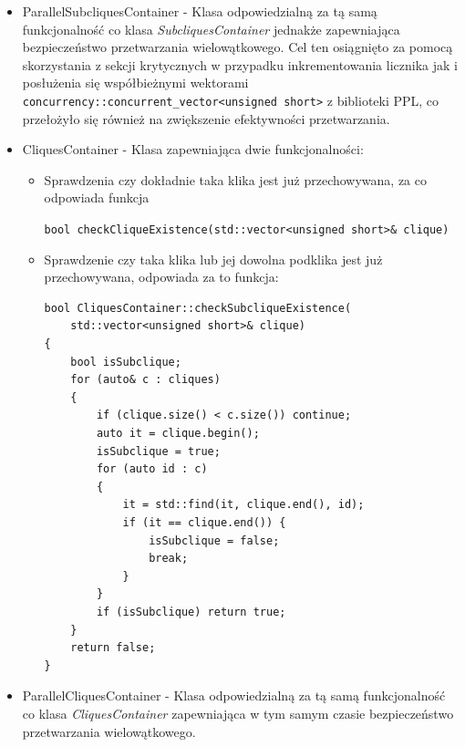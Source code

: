 \documentclass[12pt]{article}
\def\inline{\lstinline[basicstyle=\ttfamily,keywordstyle={}]}
\begin{document}
\begin{itemize}
\begin{minipage}{\linewidth}
\begin{lstlisting}[caption={Kod metody checkCliqueExistence klasy SubcliquesContainer}]
	for (auto i = 1; i < clique.size(); ++i)
	{
		for (auto id : typesMap[clique[i]])
		{
			if (types[id]) typesNew[id] = true;
		}
		types = typesNew;
		std::fill(typesNew.begin(), typesNew.end(), false);
	}

	if (std::find(types.begin(), types.end(), true) != types.end())
		return true;

	return false;
}
\end{lstlisting}
\end{minipage}
	
\item ParallelSubcliquesContainer - Klasa odpowiedzialną za tą samą funkcjonalność co klasa \textit{SubcliquesContainer} jednakże zapewniająca bezpieczeństwo przetwarzania wielowątkowego. Cel ten osiągnięto za pomocą skorzystania z sekcji krytycznych w przypadku inkrementowania licznika jak i posłużenia się współbieżnymi wektorami \inline{concurrency::concurrent_vector<unsigned short>} z biblioteki PPL, co przełożyło się również na zwiększenie efektywności przetwarzania.

\item CliquesContainer - Klasa zapewniająca dwie funkcjonalności:
\begin{itemize}
\item Sprawdzenia czy dokładnie taka klika jest już przechowywana, za co odpowiada funkcja \raggedright \inline{bool checkCliqueExistence(std::vector<unsigned short>& clique)}
\item Sprawdzenie czy taka klika lub jej dowolna podklika jest już przechowywana, odpowiada za to funkcja:
\begin{minipage}{\linewidth}
\begin{lstlisting}[caption={Kod metody checkSublicqueExistence klasy CliquesContainer }]
bool CliquesContainer::checkSubcliqueExistence(
	std::vector<unsigned short>& clique)
{
	bool isSubclique;
  	for (auto& c : cliques)
  	{
		if (clique.size() < c.size()) continue;
    	auto it = clique.begin();
    	isSubclique = true;
        for (auto id : c)
        {
        	it = std::find(it, clique.end(), id);
        	if (it == clique.end()) {
        		isSubclique = false;
        		break;
        	}
        }
   		if (isSubclique) return true;
  	}
  	return false;
}
\end{lstlisting}
\end{minipage}
\end{itemize}

\item ParallelCliquesContainer - Klasa odpowiedzialną za tą samą funkcjonalność co klasa \textit{CliquesContainer} zapewniająca w tym samym czasie bezpieczeństwo przetwarzania wielowątkowego.


\end{itemize}
\end{document}
